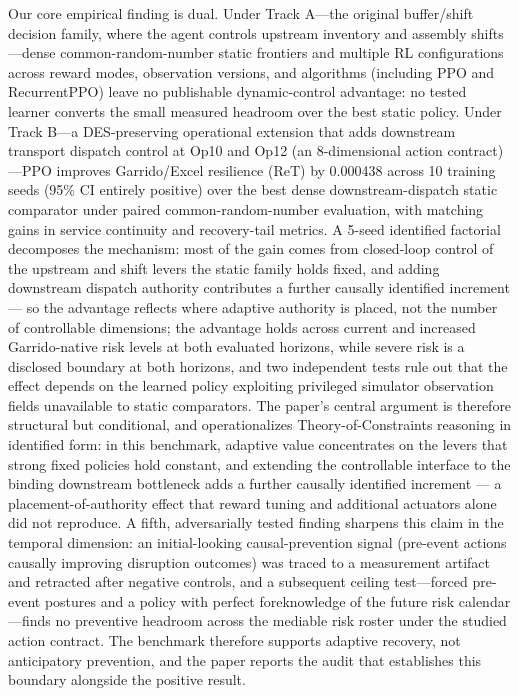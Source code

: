 Our core empirical finding is dual. Under Track A---the original
buffer/shift decision family, where the agent controls upstream
inventory and assembly shifts---dense common-random-number static
frontiers and multiple RL configurations across reward modes,
observation versions, and algorithms (including PPO and RecurrentPPO)
leave no publishable dynamic-control advantage: no tested learner
converts the small measured headroom over the best static policy. Under
Track B---a DES-preserving operational extension that adds downstream
transport dispatch control at Op10 and Op12 (an 8-dimensional action
contract)---PPO improves Garrido/Excel resilience (ReT) by 0.000438
across 10 training seeds (95\% CI entirely positive) over the best dense
downstream-dispatch static comparator under paired common-random-number evaluation, with
matching gains in service continuity and recovery-tail metrics. A
5-seed identified factorial decomposes the mechanism: most of the gain
comes from closed-loop control of the upstream and shift levers the
static family holds fixed, and adding downstream dispatch authority
contributes a further causally identified increment --- so the advantage
reflects where adaptive authority is placed, not the number of
controllable dimensions; the advantage holds across current and increased
Garrido-native risk levels at both evaluated horizons, while severe risk
is a disclosed boundary at both horizons, and two independent tests rule
out that the effect depends on the learned policy exploiting privileged
simulator observation fields unavailable to static comparators. The
paper's central argument is
therefore structural but conditional, and operationalizes
Theory-of-Constraints reasoning \cite{goldratt1984goal} in identified
form: in this benchmark, adaptive value concentrates on the levers that
strong fixed policies hold constant, and extending the controllable
interface to the binding downstream bottleneck adds a further causally
identified increment --- a placement-of-authority effect that reward
tuning and additional actuators alone did not reproduce. A fifth, adversarially
tested finding sharpens this claim in the temporal dimension: an
initial-looking causal-prevention signal (pre-event actions causally
improving disruption outcomes) was traced to a measurement artifact and
retracted after negative controls, and a subsequent ceiling test---forced
pre-event postures and a policy with perfect foreknowledge of the future
risk calendar---finds no preventive headroom across the mediable risk
roster under the studied action contract. The benchmark therefore
supports adaptive recovery, not anticipatory prevention, and the paper
reports the audit that establishes this boundary alongside the positive
result.


